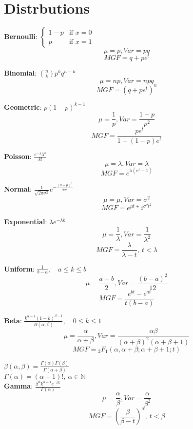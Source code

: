 \newcommand{\printdistribution}[5]{
        \textbf{#1}: $#2$
        \[\mu =  #3, Var =  #4\]\[MGF= #5\]
}
\section{Distrbutions}
\printdistribution{Bernoulli}{\begin{cases}
        1 - p & \text{if } x = 0 \\
        p & \text{if } x = 1
\end{cases}}{p}{pq}{q + pe^t}
\printdistribution{Binomial}{{n \choose k} p^k q^{n - k}}{np}{npq}{(q + pe^t)^n}
\printdistribution{Geometric}{
        p (1-p)^{k-1}
}{\frac{1}{p}}{\frac{1 - p}{p^2}}{\frac{p e^t}{1 - (1 - p) e^t}}
\printdistribution{Poisson}{
    \frac{e^{-\lambda} \lambda^{k}}{k!}
}{\lambda}{\lambda}{e^{\lambda (e^t - 1)}}
\printdistribution{Normal}{
    \frac{1}{\sqrt{2 \pi \sigma^2}} e^{ -\frac{(k - \mu)^2}{2 \sigma^2} }
}{\mu}{\sigma^2}{e^{\mu t + \frac{1}{2} \sigma^2 t^2}}
\printdistribution{Exponential}{
    \lambda e^{ -\lambda k }
}{\frac{1}{\lambda}}{\frac{1}{\lambda^2}}{\frac{\lambda}{\lambda - t}, \ t < \lambda}
\printdistribution{Uniform}{
    \frac{1}{b - a}, \quad a \leq k \leq b
}{\frac{a + b}{2}}{\frac{(b - a)^2}{12}}{\frac{e^{b t} - e^{a t}}{t (b - a)}}
\printdistribution{Beta}{
    \frac{k^{\alpha -1} (1 - k)^{\beta -1}}{B(\alpha, \beta)}, \quad 0 \leq k \leq 1
}{\frac{\alpha}{\alpha + \beta}}{\frac{\alpha \beta}{(\alpha + \beta)^2 (\alpha + \beta +1)}}{{}_2F_1(\alpha, \alpha + \beta; \alpha + \beta +1; t)}
$\beta(\alpha, \beta) = \frac{\Gamma(\alpha) \Gamma(\beta)}{\Gamma(\alpha + \beta)}$\\
$\Gamma(\alpha) = (\alpha - 1)!, \: \alpha \in \mathbb{N}$\\
\printdistribution{Gamma}{
    \frac{\beta^{\alpha} k^{\alpha -1} e^{-\beta k}}{\Gamma(\alpha)}
}{\frac{\alpha}{\beta}}{\frac{\alpha}{\beta^2}}{\left(\frac{\beta}{\beta - t}\right)^{\alpha}, \ t < \beta}
